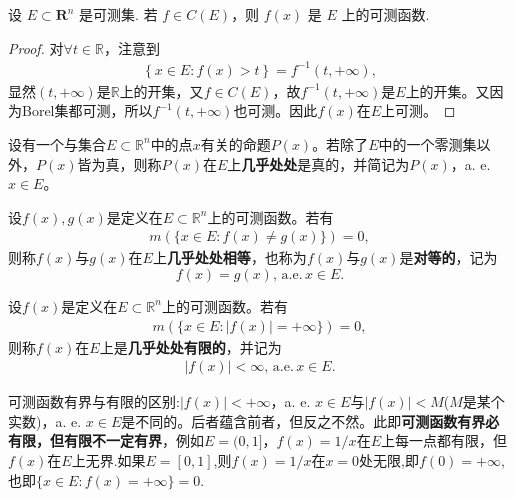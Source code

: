 \documentclass[../../main.tex]{subfiles}
\begin{document}
\begin{proposition}[连续函数必可测]\label{proposition:连续函数必可测}
设 \(E \subset \mathbf{R}^n\) 是可测集. 若 \(f \in C(E)\)，则 \(f(x)\) 是 \(E\) 上的可测函数. 
\end{proposition}
\begin{proof}
对$\forall t\in \mathbb{R}$，注意到
\begin{align*}
\left\{ x\in E:f\left( x \right) >t \right\} =f^{-1}\left( t,+\infty \right) ,
\end{align*}
显然$\left( t,+\infty \right)$是$\mathbb{R}$上的开集，又$f\in C\left( E \right)$，故$f^{-1}\left( t,+\infty \right)$是$E$上的开集。又因为Borel集都可测，所以$f^{-1}\left( t,+\infty \right)$也可测。因此$f\left( x \right)$在$E$上可测。
\end{proof}

\begin{definition}
设有一个与集合$E \subset \mathbb{R}^n$中的点$x$有关的命题$P(x)$。若除了$E$中的一个零测集以外，$P(x)$皆为真，则称$P(x)$在$E$上\textbf{几乎处处}是真的，并简记为$P(x)$，a. e.$ x\in E$。
\end{definition}

\begin{definition}
设$f(x), g(x)$是定义在$E \subset \mathbb{R}^n$上的可测函数。若有
\begin{align*}
m(\{x \in E: f(x) \neq g(x)\}) = 0,
\end{align*}
则称$f(x)$与$g(x)$在$E$上\textbf{几乎处处相等}，也称为$f(x)$与$g(x)$是\textbf{对等的}，记为$$f(x) = g(x),\,\mathrm{a}.\mathrm{e}.\,x \in E.$$

设$f(x)$是定义在$E \subset \mathbb{R}^n$上的可测函数。若有
\begin{align*}
m(\{x \in E: |f(x)| = +\infty\}) = 0,
\end{align*}
则称$f(x)$在$E$上是\textbf{几乎处处有限的}，并记为
\begin{align*}
|f(x)| < \infty,\,\mathrm{a}.\mathrm{e}.\,x \in E.
\end{align*}
\end{definition}
\begin{remark}
可测函数有界与有限的区别:$|f(x)| < +\infty$，a. e. $x \in E$与$|f(x)| < M$($M$是某个实数)，a. e. $x \in E$是不同的。后者蕴含前者，但反之不然。此即\textbf{可测函数有界必有限，但有限不一定有界}，例如\(E = (0, 1]\)，\(f(x) = 1/x\)在\(E\)上每一点都有限，但\(f(x)\)在\(E\)上无界.如果$E=[0,1]$,则\(f(x) = 1/x\)在$x=0$处无限,即$f(0)=+\infty$,也即$\{x\in E:f(x)=+\infty\}={0}.$
\end{remark}
\end{document}
